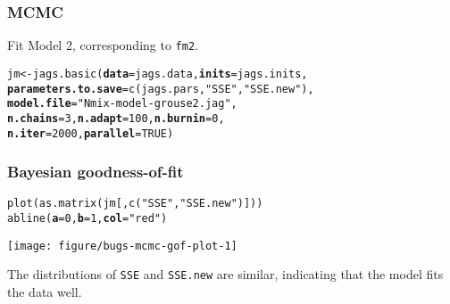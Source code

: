 \documentclass[color=usenames,dvipsnames]{beamer}\usepackage[]{graphicx}\usepackage[]{xcolor}
\makeatletter
\newcommand{\hlnum}[1]{\textcolor[rgb]{0.69,0.494,0}{#1}}%
\newcommand{\hlsng}[1]{\textcolor[rgb]{0.749,0.012,0.012}{#1}}%
\newcommand{\hldef}[1]{\textcolor[rgb]{0,0,0}{#1}}%
\newcommand{\hlkwb}[1]{\textcolor[rgb]{0,0.341,0.682}{#1}}%
\newcommand{\hlkwc}[1]{\textcolor[rgb]{0,0,0}{\textbf{#1}}}%
\newcommand{\hlkwd}[1]{\textcolor[rgb]{0.004,0.004,0.506}{#1}}%
\newenvironment{kframe}{%
 \def\at@end@of@kframe{}%
 \ifinner\ifhmode%
  \def\at@end@of@kframe{\end{minipage}}%
  \begin{minipage}{\columnwidth}%
 \fi\fi%
 \def\FrameCommand##1{\hskip\@totalleftmargin \hskip-\fboxsep
 \colorbox{shadecolor}{##1}\hskip-\fboxsep
     \hskip-\linewidth \hskip-\@totalleftmargin \hskip\columnwidth}%
 \MakeFramed {\advance\hsize-\width
   \@totalleftmargin\z@ \linewidth\hsize
   \@setminipage}}%
 {\par\unskip\endMakeFramed%
 \at@end@of@kframe}
\newenvironment{knitrout}{}{} %
\newcommand{\inr}[1]{\colorbox{inlinecolor}{\texttt{#1}}}
\makeatother
\begin{document}
\begin{frame}[fragile]
  \frametitle{MCMC}
  Fit Model 2, corresponding to \inr{fm2}. 
  \vspace{-6pt}
\begin{knitrout}\footnotesize
{}\color{fgcolor}\begin{kframe}
\begin{alltt}
\hldef{jm} \hlkwb{<-} \hlkwd{jags.basic}\hldef{(}\hlkwc{data}\hldef{=jags.data,} \hlkwc{inits}\hldef{=jags.inits,}
                 \hlkwc{parameters.to.save}\hldef{=}\hlkwd{c}\hldef{(jags.pars,} \hlsng{"SSE"}\hldef{,} \hlsng{"SSE.new"}\hldef{),}
                 \hlkwc{model.file}\hldef{=}\hlsng{"Nmix-model-grouse2.jag"}\hldef{,}
                 \hlkwc{n.chains}\hldef{=}\hlnum{3}\hldef{,} \hlkwc{n.adapt}\hldef{=}\hlnum{100}\hldef{,} \hlkwc{n.burnin}\hldef{=}\hlnum{0}\hldef{,}
                 \hlkwc{n.iter}\hldef{=}\hlnum{2000}\hldef{,} \hlkwc{parallel}\hldef{=}\hlnum{TRUE}\hldef{)}
\end{alltt}
\end{kframe}
\end{knitrout}
\end{frame}




\begin{frame}[fragile]
  \frametitle{Bayesian goodness-of-fit}
\begin{knitrout}\footnotesize
{}\color{fgcolor}\begin{kframe}
\begin{alltt}
\hlkwd{plot}\hldef{(}\hlkwd{as.matrix}\hldef{(jm[,}\hlkwd{c}\hldef{(}\hlsng{"SSE"}\hldef{,} \hlsng{"SSE.new"}\hldef{)]))}
\hlkwd{abline}\hldef{(}\hlkwc{a}\hldef{=}\hlnum{0}\hldef{,} \hlkwc{b}\hldef{=}\hlnum{1}\hldef{,} \hlkwc{col}\hldef{=}\hlsng{"red"}\hldef{)}
\end{alltt}
\end{kframe}

{\centering \texttt{[image: figure/bugs-mcmc-gof-plot-1]} 

}


\end{knitrout}
  \vfill
  \small
  The distributions of {\tt SSE} and {\tt SSE.new} are similar,
  indicating that the model fits the data well.
\end{frame}
\end{document}
